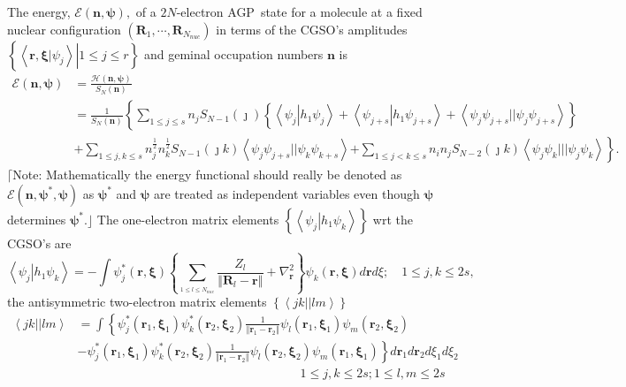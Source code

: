 \documentclass[aps,preprint]{revtex4}%
\begin{document}
The energy, $\mathcal{E}\left(  \bm{n,\psi}\right)  ,$ of a $2N$-electron
AGP\ state for a molecule at a fixed nuclear configuration $\left(
\bm{R}_{1},\cdots,\bm{R}_{N_{nuc}}\right)  $ in terms of the CGSO's amplitudes
$\left\{  \left.  \left\langle \left.  \bm{r,\xi}\right\vert \psi
_{j}\right\rangle \right\vert 1\leq j\leq r\right\}  $ and geminal occupation
numbers $\bm{n}$ is
\begin{align}
\mathcal{E}\left(  \bm{n,\psi}\right)   &  =\frac{\mathcal{H}\left(
\bm{n,\psi}\right)  }{S_{N}\left(  \bm{n}\right)  }\nonumber\\
&  =\frac{1}{S_{N}\left(  \bm{n}\right)  }\left\{  \sum_{1\leq j\leq s}%
n_{j}S_{N-1}\left(  \jmath\right)  \left\{  \left\langle \psi_{j}\left\vert
h_{1}\psi_{j}\right.  \right\rangle +\left\langle \psi_{j+s}\left\vert
h_{1}\psi_{j+s}\right.  \right\rangle +\left\langle \psi_{j}\psi_{j+s}%
||\psi_{j}\psi_{j+s}\right\rangle \right\}  \right. \nonumber\\
&  +\sum_{1\leq j,k\leq s}n_{j}^{\frac{1}{2}}n_{k}^{\frac{1}{2}}S_{N-1}\left(
\jmath k\right)  \left\langle \psi_{j}\psi_{j+s}||\psi_{k}\psi_{k+s}%
\right\rangle \left.  +\sum_{1\leq j<k\leq s}n_{i}n_{j}S_{N-2}\left(  \jmath
k\right)  \left\langle \psi_{j}\psi_{k}|||\psi_{j}\psi_{k}\right\rangle
\right\}  . \label{energy}%
\end{align}
$\lceil$Note: Mathematically the energy functional should really be denoted as
$\mathcal{E}\left(  \bm{n,\psi}^{\ast}\bm{,\psi}\right)  $ as $\bm{\psi}^{\ast
}$ and $\bm{\psi}$ are treated as independent variables even though
$\bm{\psi}$ determines $\bm{\psi}^{\ast}$.$\rfloor$ The one-electron matrix
elements $\left\{  \left\langle \psi_{j}\left\vert h_{1}\psi_{k}\right.
\right\rangle \right\}  $ wrt the CGSO's are
\begin{equation}
\left\langle \psi_{j}\left\vert h_{1}\psi_{k}\right.  \right\rangle =-\int
\psi_{j}^{\ast}\left(  \bm{r,\xi}\right)  \left\{  \sum_{_{1\leq l\leq
N_{nuc}}}\frac{Z_{l}}{\left\Vert \bm{R}_{l}-\bm{r}\right\Vert }+\nabla
_{\bm{r}}^{2}\right\}  \psi_{k}\left(  \bm{r,\xi}\right)  d\bm{r}d\xi
;\quad1\leq j,k\leq2s, \label{h1}%
\end{equation}
the antisymmetric two-electron matrix elements $\left\{  \left\langle
jk||lm\right\rangle \right\}  $
\begin{align}
\left\langle jk||lm\right\rangle  &  =\int\left\{  \psi_{j}^{\ast}\left(
\bm{r}_{1}\bm{,\xi}_{1}\right)  \psi_{k}^{\ast}\left(  \bm{r}_{2}%
\bm{,\xi}_{2}\right)  \frac{1}{\left\Vert \bm{r}_{1}-\bm{r}_{2}\right\Vert
}\psi_{l}\left(  \bm{r}_{1}\bm{,\xi}_{1}\right)  \psi_{m}\left(
\bm{r}_{2}\bm{,\xi}_{2}\right)  \right. \nonumber\\
&  -\left.  \psi_{j}^{\ast}\left(  \bm{r}_{1}\bm{,\xi}_{1}\right)  \psi
_{k}^{\ast}\left(  \bm{r}_{2}\bm{,\xi}_{2}\right)  \frac{1}{\left\Vert
\bm{r}_{1}-\bm{r}_{2}\right\Vert }\psi_{l}\left(  \bm{r}_{2}\bm{,\xi}_{2}%
\right)  \psi_{m}\left(  \bm{r}_{1}\bm{,\xi}_{1}\right)  \right\}
d\bm{r}_{1}d\bm{r}_{2}d\xi_{1}d\xi_{2}\nonumber\\
&  \left.  {}\right.  \qquad\qquad\qquad\qquad\qquad\qquad\qquad\qquad
\qquad1\leq j,k\leq2s;1\leq l,m\leq2s \label{h2}%
\end{align}
\end{document}

